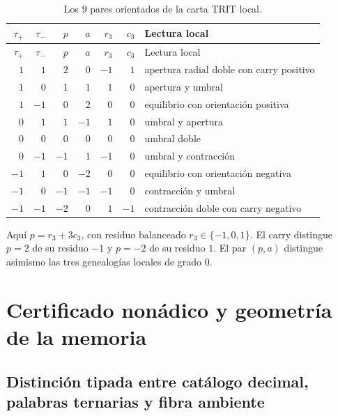 \begin{longtable}{rrrrrrp{}}
\caption{Los \(9\) pares orientados de la carta TRIT local.}
\label{espiral:tab:ap-nueve-pares}\\
\toprule
\(\tau_+\)&\(\tau_-\)&\(p\)&\(a\)&\(r_3\)&\(c_3\)&Lectura local\\
\midrule
\endfirsthead
\toprule
\(\tau_+\)&\(\tau_-\)&\(p\)&\(a\)&\(r_3\)&\(c_3\)&Lectura local\\
\midrule
\endhead
\( 1\)&\( 1\)&\( 2\)&\( 0\)&\(-1\)&\( 1\)&apertura radial doble con carry positivo\\
\( 1\)&\( 0\)&\( 1\)&\( 1\)&\( 1\)&\( 0\)&apertura y umbral\\
\( 1\)&\(-1\)&\( 0\)&\( 2\)&\( 0\)&\( 0\)&equilibrio con orientación positiva\\
\( 0\)&\( 1\)&\( 1\)&\(-1\)&\( 1\)&\( 0\)&umbral y apertura\\
\( 0\)&\( 0\)&\( 0\)&\( 0\)&\( 0\)&\( 0\)&umbral doble\\
\( 0\)&\(-1\)&\(-1\)&\( 1\)&\(-1\)&\( 0\)&umbral y contracción\\
\(-1\)&\( 1\)&\( 0\)&\(-2\)&\( 0\)&\( 0\)&equilibrio con orientación negativa\\
\(-1\)&\( 0\)&\(-1\)&\(-1\)&\(-1\)&\( 0\)&contracción y umbral\\
\(-1\)&\(-1\)&\(-2\)&\( 0\)&\( 1\)&\(-1\)&contracción doble con carry negativo\\
\bottomrule
\end{longtable}

Aquí \(p=r_3+3c_3\), con residuo balanceado
\(r_3\in\{-1,0,1\}\). El carry distingue \(p=2\) de su residuo \(-1\) y
\(p=-2\) de su residuo \(1\). El par
\((p,a)\) distingue asimismo las tres genealogías locales de
grado \(0\).

\chapter{Certificado nonádico y geometría de la memoria}

\section{Distinción tipada entre catálogo decimal, palabras ternarias y fibra ambiente}

